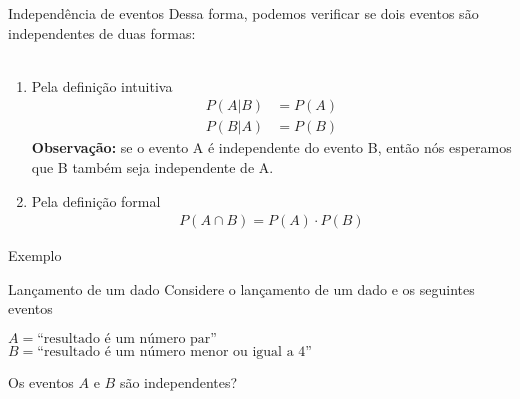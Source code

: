 \documentclass[10pt]{beamer}\usepackage[]{graphicx}\usepackage[]{color}
\theoremstyle{definition}
\begin{document}
\begin{frame}{Independência de eventos}
  Dessa forma, podemos verificar se dois eventos são independentes de
  duas formas: \\~\\
  \begin{enumerate}
  \item Pela definição intuitiva
    \begin{align*}
      P(A|B) &= P(A) \\
      P(B|A) &= P(B)
    \end{align*}
    \textbf{Observação:} se o evento A é independente do evento B, então
    nós esperamos que B também seja independente de A.
  \item Pela definição formal
    \begin{align*}
      P(A \cap B) = P(A) \cdot P(B)
    \end{align*}
  \end{enumerate}
\end{frame}

\begin{frame}[fragile]{Exemplo}
  \begin{block}{Lançamento de um dado}
    Considere o lançamento de um dado e os seguintes eventos
    \begin{center}
      $A = \text{``resultado é um número par''}$\\
      $B = \text{``resultado é um número menor ou igual a 4''}$
    \end{center}
    Os eventos $A$ e $B$ são independentes?
  \end{block}
  \begin{center}
  \end{center}
\end{frame}
\end{document}
